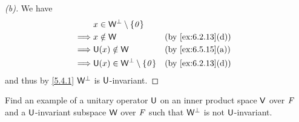 \begin{proof}[(b)]
  We have
  \begin{align*}
             & x \in \W^{\perp} \setminus \set{\zv}                            \\
    \implies & x \notin \W                              &  & \by{ex:6.2.13}[d] \\
    \implies & \U(x) \notin \W                          &  & \by{ex:6.5.15}[a] \\
    \implies & \U(x) \in \W^{\perp} \setminus \set{\zv} &  & \by{ex:6.2.13}[d]
  \end{align*}
  and thus by \cref{5.4.1} \(\mathsf{W}^{\perp}\) is \(\mathsf{U}\)-invariant.
\end{proof}

\begin{ex}\label{ex:6.5.16}
  Find an example of a unitary operator \(\mathsf{U}\) on an inner product space \(\mathsf{V}\) over \(\mathit{F}\) and a \(\mathsf{U}\)-invariant subspace \(\mathsf{W}\) over \(\mathit{F}\) such that \(\mathsf{W}^{\perp}\) is not \(\mathsf{U}\)-invariant.
\end{ex}

